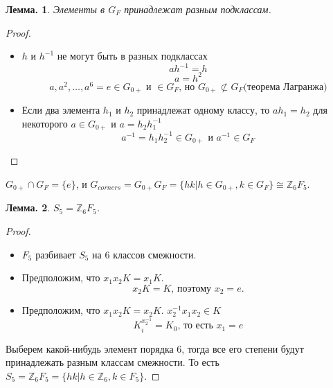 \documentclass[utf8,russian]{beamer}
\newtheorem{ru_theo}{Лемма.}
\renewenvironment{theorem}{\begin{ru_theo}}{\end{ru_theo}}
\begin{document}
\begin{frame}
\begin{theorem}
	Элементы в $G_F$ принадлежат разным подклассам.
\end{theorem}
\begin{proof}
\begin{itemize}
	\item $h$ и $h^{-1}$ не могут быть в разных подклассах
	$$ah^{-1}=h$$
	$$a=h^2$$
	$$a,a^2,\ldots,a^6=e\in G_{0+}\text{ и }\in G_F\text{, но }G_{0+}\not\subset G_F\text{(теорема Лагранжа)}$$
	\item
	Если два элемента $h_1$ и $h_2$ принадлежат одному классу, то $ah_1=h_2$ для некоторого $a\in G_{0+}$ и $a=h_2h_1^{-1}$ $$a^{-1}=h_1h_2^{-1}\in G_{0+}\text{ и }a^{-1}\in G_F$$
\end{itemize}
\vspace*{-0.4cm}
\end{proof}
$G_{0+}\cap G_F=\{e\}$, и $G_{corners}=G_{0+}G_F=\{hk|h\in G_{0+},k\in G_F\}\cong\mathbb{Z}_6F_5$.
\end{frame}


\begin{frame}
\begin{theorem}
$S_5=\mathbb{Z}_6F_5$.
\end{theorem}
\begin{proof}
	\begin{itemize}
		\item $F_5$ разбивает $S_5$ на 6 классов смежности.
		\item Предположим, что $x_1x_2K=x_1K$. $$x_2K=K\text{, поэтому } x_2=e\text{.}$$
		\item Предположим, что $x_1x_2K=x_2K$. $x_2^{-1}x_1x_2\in K$
		$$K_i^{x_2^{-1}}=K_0\text{, то есть } x_1=e$$
	\end{itemize}
	Выберем какой-нибудь элемент порядка 6, тогда все его степени будут принадлежать разным классам смежности. То есть $S_5=\mathbb{Z}_6F_5=\{hk|h\in\mathbb{Z}_6,k\in F_5\}$.
\end{proof}
\end{frame}

\end{document}
